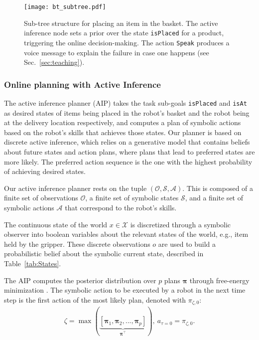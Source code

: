 \begin{figure}[b!]
    \centering
    \texttt{[image: bt\_subtree.pdf]}
    \caption{Sub-tree structure for placing an item in the basket. The active inference node sets a prior over the state \texttt{isPlaced{}} for a product, triggering the online decision-making. The action \texttt{Speak{}} produces a voice message to explain the failure in case one happens (see Sec.~\ref{sec:teaching}).}
    \label{fig:subtree}
\end{figure}




\subsubsection{Online planning with Active Inference} 

The active inference planner (AIP) takes the task sub-goals \texttt{isPlaced} and \texttt{isAt} as desired states of items being placed in the robot's basket and the robot being at the delivery location respectively, and computes a plan of symbolic actions based on the robot's skills that achieves those states.
Our planner is based on discrete active inference, which relies on a generative model that contains beliefs about future states and action plans, where plans that lead to preferred states are more likely. The preferred action sequence is the one with the highest probability of achieving desired states. 

Our active inference planner rests on the tuple $(\mathcal{O},\mathcal{S},\mathcal{A})$. This is composed of a finite set of observations $\mathcal{O}$, a finite set of symbolic states $\mathcal{S}$, and a finite set of symbolic actions $\mathcal{A}$ that correspond to the robot's skills.


The continuous state of the world $x\in\mathcal{X}$ is discretized through a symbolic observer into boolean variables about the relevant states of the world, e.g., item held by the gripper. These discrete observations $o$ are used to build a probabilistic belief about the symbolic current state, described in Table~\ref{tab:States}.



The AIP computes the posterior distribution over $p$ plans $\bm \pi$ through free-energy minimization \cite{pezzato2023active}. The symbolic action to be executed by a robot in the next time step is the first action of the most likely plan, denoted with $\pi_{\zeta, 0}$:
\begin{eqnarray}
\label{eq:a_t}
    \zeta = \max(\underbrace{[\bm\pi_{1}, \bm\pi_{2},...,\bm\pi_{p}]}_{\bm \pi^\top}),\ 
    a_{\tau=0} = \pi_{\zeta, 0}.
\end{eqnarray}




